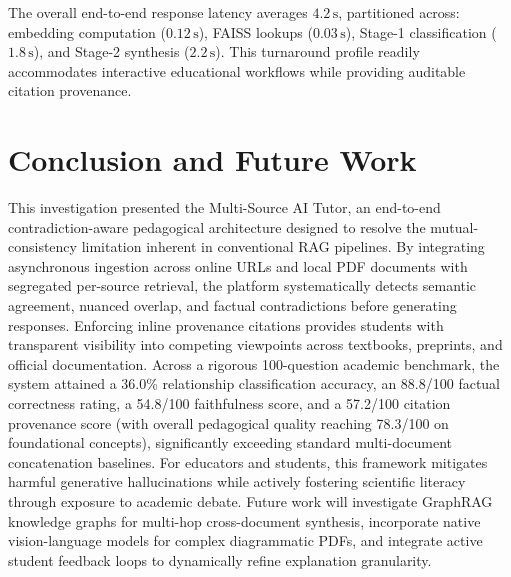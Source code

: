 \documentclass[conference]{IEEEtran}
\begin{document}
The overall end-to-end response latency averages $4.2\,\text{s}$, partitioned across: embedding computation ($0.12\,\text{s}$), FAISS lookups ($0.03\,\text{s}$), Stage-1 classification ($1.8\,\text{s}$), and Stage-2 synthesis ($2.2\,\text{s}$). This turnaround profile readily accommodates interactive educational workflows while providing auditable citation provenance.

\section{Conclusion and Future Work}
\label{sec:conclusion}
This investigation presented the Multi-Source AI Tutor, an end-to-end contradiction-aware pedagogical architecture designed to resolve the mutual-consistency limitation inherent in conventional RAG pipelines. By integrating asynchronous ingestion across online URLs and local PDF documents with segregated per-source retrieval, the platform systematically detects semantic agreement, nuanced overlap, and factual contradictions before generating responses. Enforcing inline provenance citations provides students with transparent visibility into competing viewpoints across textbooks, preprints, and official documentation. Across a rigorous 100-question academic benchmark, the system attained a 36.0\% relationship classification accuracy, an 88.8/100 factual correctness rating, a 54.8/100 faithfulness score, and a 57.2/100 citation provenance score (with overall pedagogical quality reaching 78.3/100 on foundational concepts), significantly exceeding standard multi-document concatenation baselines. For educators and students, this framework mitigates harmful generative hallucinations while actively fostering scientific literacy through exposure to academic debate. Future work will investigate GraphRAG knowledge graphs for multi-hop cross-document synthesis, incorporate native vision-language models for complex diagrammatic PDFs, and integrate active student feedback loops to dynamically refine explanation granularity.
\end{document}
